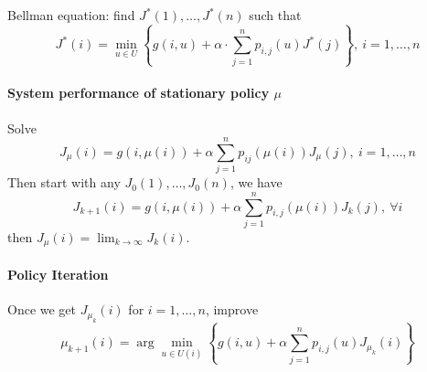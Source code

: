 Bellman equation:
find $J^*(1),\dots,J^*(n)$ such that
\[
J^*(i) = \min_{u\in U}\left\{
g(i,u)+\alpha\cdot\sum_{j=1}^np_{i,j}(u)J^*(j)
\right\},\ i=1,\dots,n
\]
\paragraph{
System performance of stationary policy $\mu$
}
Solve
\[
J_{\mu}(i) = g(i,\mu(i))+\alpha\sum_{j=1}^np_{ij}(\mu(i))J_{\mu}(j),\ i=1,\dots,n
\]
Then start with any $J_0(1),\dots,J_0(n)$, we have
\[
J_{k+1}(i) = g(i,\mu(i))+\alpha\sum_{j=1}^np_{i,j}(\mu(i))
J_k(j),\ \forall i
\]
then $J_{\mu}(i) = \lim_{k\to\infty}J_k(i)$.

\paragraph{Policy Iteration}
Once we get $J_{\mu_k}(i)$ for $i=1,\dots,n$, improve
\[
\mu_{k+1}(i) = \arg\min_{u\in U(i)}
\left\{
g(i,u)+\alpha\sum_{j=1}^np_{i,j}(u)J_{\mu_k}(i)
\right\}
\]


\begin{example}




\end{example}
